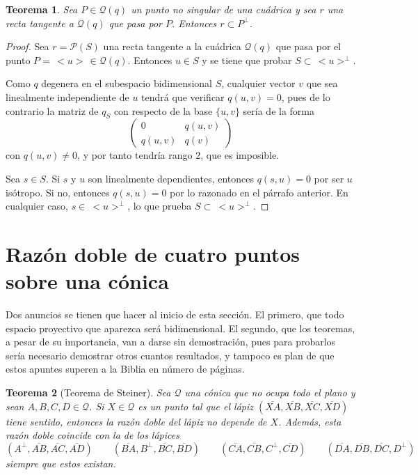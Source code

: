 \documentclass[12pt]{report}
\newtheorem{theorem}{Teorema}[chapter]
\theoremstyle{definition}
\theoremstyle{definition}
\theoremstyle{remark}
\begin{document}
\begin{theorem}
Sea $P \in \mathcal{Q}(q)$ un punto no singular de una cuádrica y sea $r$ una recta tangente a $\mathcal{Q}(q)$ que pasa por $P$. Entonces $r \subset P^\perp$.
\end{theorem}
\begin{proof}
Sea $r = \mathcal{P}(S)$ una recta tangente a la cuádrica $\mathcal{Q}(q)$ que pasa por el punto $P = \, <u> \, \in \mathcal{Q}(q)$. Entonces $u \in S$ y se tiene que probar $S \subset \, <u>^\perp$.

\vspace{2mm}
Como $q$ degenera en el subespacio bidimensional $S$, cualquier vector $v$ que sea linealmente independiente de $u$ tendrá que verificar $q(u,v) = 0$, pues de lo contrario la matriz de $q_S$ con respecto de la base $\{u,v\}$ sería de la forma
\[\begin{pmatrix*}
    0 & q(u,v) \\
    q(u,v) & q(v)
\end{pmatrix*}\]
con $q(u,v) \neq 0$, y por tanto tendría rango $2$, que es imposible.

\vspace{2mm}
Sea $s \in S$. Si $s$ y $u$ son linealmente dependientes, entonces $q(s,u) = 0$ por ser $u$ isótropo. Si no, entonces $q(s,u) = 0$ por lo razonado en el párrafo anterior. En cualquier caso, $s \in \ <u>^\perp$, lo que prueba $S \subset \ <u>^\perp$.
\end{proof}

\section{Razón doble de cuatro puntos sobre una cónica}

Dos anuncios se tienen que hacer al inicio de esta sección. El primero, que todo espacio proyectivo que aparezca será bidimensional. El segundo, que los teoremas, a pesar de su importancia, van a darse sin demostración, pues para probarlos sería necesario demostrar otros cuantos resultados, y tampoco es plan de que estos apuntes superen a la Biblia en número de páginas.

\begin{theorem}[Teorema de Steiner]
Sea $\mathcal{Q}$ una cónica que no ocupa todo el plano y sean $A,B,C,D \in \mathcal{Q}$. Si $X \in \mathcal{Q}$ es un punto tal que el lápiz $(\overline{XA}, \overline{XB}, \overline{XC}, \overline{XD})$ tiene sentido, entonces la razón doble del lápiz no depende de $X$. Además, esta razón doble coincide con la de los lápices
\[
(A^\perp , \overline{AB} , \overline{AC} , \overline{AD}) \qquad (\overline{BA} , B^\perp , \overline{BC} ,\overline{BD}) \qquad (\overline{CA} , \overline{CB} , C^\perp , \overline{CD}) \qquad (\overline{DA} , \overline{DB} , \overline{DC} , D^\perp)
\]
siempre que estos existan.
\end{theorem}
\end{document}
